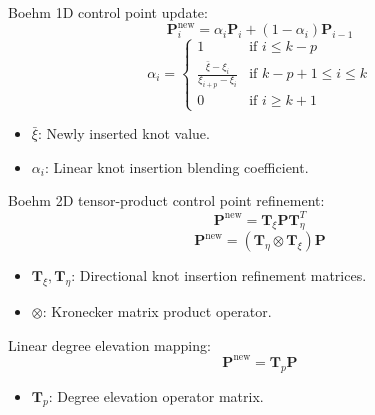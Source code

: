 \documentclass[12pt,a4paper,oneside]{report}
\newcommand{\vect}[1]{\mathbf{#1}}
\newcommand{\mat}[1]{\mathbf{#1}}
\begin{document}
Boehm 1D control point update:
\begin{equation}
    \vect{P}_i^{\text{new}} = \alpha_i \vect{P}_i + (1 - \alpha_i) \vect{P}_{i-1}
\end{equation}
\begin{equation}
    \alpha_i = \begin{cases}
        1                                           & \text{if } i \le k - p           \\
        \frac{\bar{\xi} - \xi_i}{\xi_{i+p} - \xi_i} & \text{if } k - p + 1 \le i \le k \\
        0                                           & \text{if } i \ge k + 1
    \end{cases}
\end{equation}
\begin{tcolorbox}[colback=gray!5!white,colframe=gray!60!black,title={Term Definitions \& Parameter Dependencies}]
\begin{itemize}
    \item $\bar{\xi}$: Newly inserted knot value.
    \item $\alpha_i$: Linear knot insertion blending coefficient.
\end{itemize}
\end{tcolorbox}

Boehm 2D tensor-product control point refinement:
\begin{equation}
    \mat{P}^{\text{new}} = \mat{T}_{\xi} \mat{P} \mat{T}_{\eta}^T
\end{equation}
\begin{equation}
    \vect{P}^{\text{new}} = \left( \mat{T}_{\eta} \otimes \mat{T}_{\xi} \right) \vect{P}
\end{equation}
\begin{tcolorbox}[colback=gray!5!white,colframe=gray!60!black,title={Term Definitions \& Parameter Dependencies}]
\begin{itemize}
    \item $\mat{T}_{\xi}, \mat{T}_{\eta}$: Directional knot insertion refinement matrices.
    \item $\otimes$: Kronecker matrix product operator.
\end{itemize}
\end{tcolorbox}

Linear degree elevation mapping:
\begin{equation}
    \vect{P}^{\text{new}} = \mat{T}_p \vect{P}
\end{equation}
\begin{tcolorbox}[colback=gray!5!white,colframe=gray!60!black,title={Term Definitions \& Parameter Dependencies}]
\begin{itemize}
    \item $\mat{T}_p$: Degree elevation operator matrix.
\end{itemize}
\end{tcolorbox}
\end{document}
